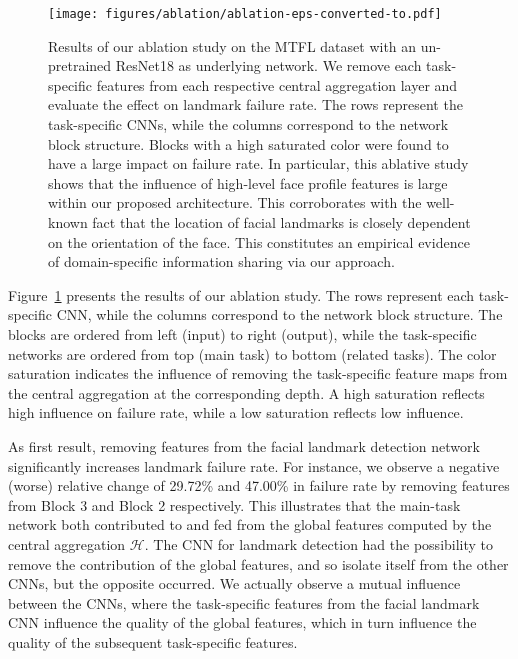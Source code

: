 \documentclass[runningheads]{llncs}
\begin{document}
\begin{figure}[t]
    \centering
    \texttt{[image: figures/ablation/ablation-eps-converted-to.pdf]}
    \caption{Results of our ablation study on the MTFL dataset with an un-pretrained ResNet18 as underlying network. We remove each task-specific features from each respective central aggregation layer and evaluate the effect on landmark failure rate. The rows represent the task-specific CNNs, while the columns correspond to the network block structure. Blocks with a high saturated color were found to have a large impact on failure rate. In particular, this ablative study shows that the influence of high-level face profile features is large within our proposed architecture. This corroborates with the well-known fact that the location of facial landmarks is closely dependent on the orientation of the face. This constitutes an empirical evidence of domain-specific information sharing via our approach.}
    \label{fig:ablation-results}
\end{figure}

Figure~\ref{fig:ablation-results} presents the results of our ablation study. The rows represent each task-specific CNN, while the columns correspond to the network block structure. The blocks are ordered from left (input) to right (output), while the task-specific networks are ordered from top (main task) to bottom (related tasks). The color saturation indicates the influence of removing the task-specific feature maps from the central aggregation at the corresponding depth. A high saturation reflects high influence on failure rate, while a low saturation reflects low influence. 

As first result, removing features from the facial landmark detection network significantly increases landmark failure rate. For instance, we observe a negative (worse) relative change of 29.72\% and 47.00\% in failure rate by removing features from Block 3 and Block 2 respectively. This illustrates that the main-task network both contributed to and fed from the global features computed by the central aggregation $\mathcal{H}$. The CNN for landmark detection had the possibility to remove the contribution of the global features, and so isolate itself from the other CNNs, but the opposite occurred. We actually observe a mutual influence between the CNNs, where the task-specific features from the facial landmark CNN influence the quality of the global features, which in turn influence the quality of the subsequent task-specific features.
\end{document}

